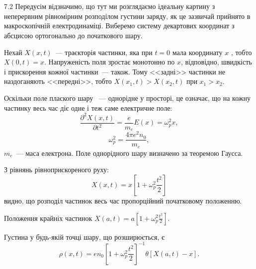 \protect \section *{}
\begin{Solution}{7.{2}}
	Передусім відзначимо, що тут ми розглядаємо ідеальну картину з неперервним рівномірним розподілом густини заряду, як це зазвичай прийнято в макроскопічній електродинаміці. Виберемо систему декартових координат з абсцисою ортогонально до початкового шару.

	Нехай $X(x,t)$~--- траєкторія частинки, яка при $t = 0$   мала координату $x$ , тобто $X(0,t) = x$. Напруженість поля зростає монотонно по $x$, відповідно, швидкість і прискорення кожної частинки~--- також. Тому <<задні>> частинки не наздоганяють <<передні>>, тобто  $X(x_1,t) > X(x_2,t)$  при ${x_1} > {x_2}$.



		Оскільки поле плаского шару ~--- однорідне у просторі, це означає, що на кожну частинку весь час діє одне і теж саме електричне поле:
		\[
			\frac{{{\partial ^2}X(x,t)}}{{\partial {t^2}}} = \frac{e}{m_e}E(x) = \omega _p^2x,
		\]
		\[
			\omega _p^2 = \frac{{4\pi {e^2}{n_0}}}{m_e},
		\]
	$m_e$~--- маса електрона. Поле однорідного шару визначено за теоремою Гаусса.

		З рівнянь рівноприскореного руху:
		\[
			X(x,t) = x\left[ {1 + \omega _p^2\frac{{{t^2}}}{2}} \right]
		\]
		видно, що розподіл частинок весь час пропорційний початковому положенню.


		Положення крайніх частинок $X(a,t) = a\left[ {1 + \omega _p^2\frac{{{t^2}}}{2}} \right]$.

        \clearpage

	Густина у будь-якій точці шару, що розширюється, є
	\[
		\rho (x,t) = e{n_0}{\left[ {1 + \omega _p^2\frac{{{t^2}}}{2}} \right]^{ - 1}}\theta \left[ {X(a,t) - x} \right].
	\]
\end{Solution}
